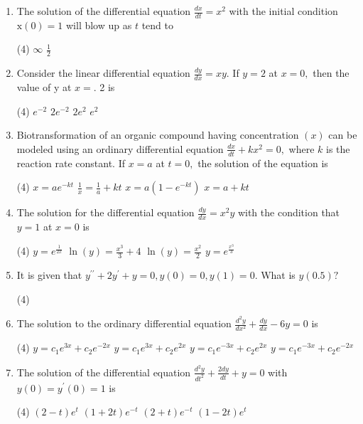 \begin{enumerate}[label=\color{ocre}\textbf{\arabic*.}]
\begin{tasks}
\end{tasks}
\item  The solution of the differential equation $\frac{d x}{d t}=x^{2}$ with the initial condition $\mathrm{x}(0)=1$ will blow up as $t$ tend to
\begin{tasks}(4)
\task[\textbf{a.}]$\infty$ 
\task[\textbf{c.}]$\frac{1}{2}$ 
\end{tasks}
\item  Consider the linear differential equation $\frac{d y}{d x}=x y .$ If $y=2$ at $x=0,$ then the value of y at $x=$. 2 is

\begin{tasks}(4)
	\task[\textbf{a.}]$e^{-2}$ 
	\task[\textbf{b.}]$2 e^{-2}$
	\task[\textbf{c.}] $2 e^{2}$
	\task[\textbf{d.}]$e^{2}$
\end{tasks}
\item Biotransformation of an organic compound having concentration $(x)$ can be modeled using an ordinary differential equation $\frac{d x}{d t}+k x^{2}=0,$ where $k$ is the reaction rate constant. If $x=a$ at $t=0,$ the solution of the equation is
\begin{tasks}(4)
	\task[\textbf{a.}]$x=a e^{-k t}$ 
	\task[\textbf{b.}]$\frac{1}{x}=\frac{1}{a}+k t$
	\task[\textbf{c.}]$x=a\left(1-e^{-k t}\right)$ 
	\task[\textbf{d.}]$x=a+k t$
\end{tasks}
\item The solution for the differential equation $\frac{d y}{d x}=x^{2} y$ with the condition that $y=1$ at $x=0$ is
\begin{tasks}(4)
	\task[\textbf{a.}] $y=e^{\frac{1}{2 x}}$ 
	\task[\textbf{b.}] $\ln (y)=\frac{x^{3}}{3}+4$
	\task[\textbf{c.}] $\ln (y)=\frac{x^{2}}{2}$ 
	\task[\textbf{d.}] $y=e^{\frac{x^{3}}{3}}$
\end{tasks}
\item It is given that $y^{\prime \prime}+2 y^{\prime}+y=0, y(0)=0, y(1)=0$.
What is $y(0.5) ?$
\begin{tasks}(4)
\end{tasks}
\item The solution to the ordinary differential equation $\frac{d^{2} y}{d x^{2}}+\frac{d y}{d x}-6 y=0$ is
\begin{tasks}(4)
	\task[\textbf{a.}] $y=c_{1} e^{3 x}+c_{2} e^{-2 x}$ 
	\task[\textbf{b.}]$y=c_{1} e^{3 x}+c_{2} e^{2 x}$
	\task[\textbf{c.}] $y=c_{1} e^{-3 x}+c_{2} e^{2 x}$ 
	\task[\textbf{d.}] $y=c_{1} e^{-3 x}+c_{2} e^{-2 x}$
\end{tasks}
\item The solution of the differential equation $\frac{d^{2} y}{d t^{2}}+\frac{2 d y}{d t}+y=0$ with $y(0)=y^{\prime}(0)=1$ is

\begin{tasks}(4)
	\task[\textbf{a.}] $(2-t) e^{t}$ 
	\task[\textbf{b.}]$(1+2 t) e^{-t}$
	\task[\textbf{c.}]$(2+t) e^{-t}$ 
	\task[\textbf{d.}]$(1-2 t) e^{t}$
\end{tasks}
\end{enumerate}
